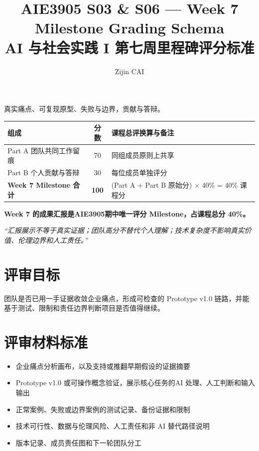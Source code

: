 \documentclass[11pt]{article}
\title{\Large \zhhei\bfseries AIE3905 S03 \& S06 --- Week 7 Milestone Grading Schema\\[0.4em]
       \large \zhhei\bfseries AI 与社会实践 I 第七周里程碑评分标准}
\author{Zijin CAI}
\newcommand{\formaltable}{%
  \small
  \setlength{\tabcolsep}{5pt}%
  \renewcommand{\arraystretch}{1.2}%
  \setlength{\arrayrulewidth}{0.4pt}%
}
\renewcommand{\arraystretch}{1.2}
\begin{document}
\makeatletter
\renewcommand{\maketitle}{
  \begin{center}
    {\Large \@title \par}
  \end{center}
}
\makeatother

\maketitle

\begin{center}
\small 真实痛点、可复现原型、失败与边界，贡献与答辩。
\end{center}
\vspace{0.2cm}

\begin{center}
\formaltable
\begin{tabularx}{\textwidth}{|Y|c|Y|}
\hline
\textbf{组成} & \textbf{分数} & \textbf{课程总评换算与备注} \\ \hline
Part A 团队共同工作留痕 & 70 & 同组成员原则上共享 \\ \hline
Part B 个人贡献与答辩 & 30 & 每位成员单独评分 \\ \hline
\textbf{Week 7 Milestone 合计} & \textbf{100} & (Part A + Part B 原始分) $\times$ 40\% = 40\% 课程分  \\ \hline
\end{tabularx}
\end{center}

\noindent\textbf{Week 7 的成果汇报是AIE3905期中唯一评分 Milestone，占课程总分 40\%。}

\noindent\textit{“汇报展示不等于真实证据；团队高分不替代个人理解；技术复杂度不影响真实价值、伦理边界和人工责任。”}

\section{评审目标}
团队是否已用一手证据收敛企业痛点，形成可检查的 Prototype v1.0 链路，并能基于测试、限制和责任边界判断项目是否值得继续。

\section{评审材料标准}
\begin{itemize}
  \item 企业痛点分析画布，以及支持或推翻早期假设的证据摘要
  \item Prototype v1.0 或可操作概念验证，展示核心任务的AI 处理、人工判断和输入输出
  \item 正常案例、失败或边界案例的测试记录、备份证据和限制
  \item 技术可行性、数据与伦理风险、人工责任和非 AI 替代路径说明
  \item 版本记录、成员责任图和下一轮团队分工
\end{itemize}
\end{document}
